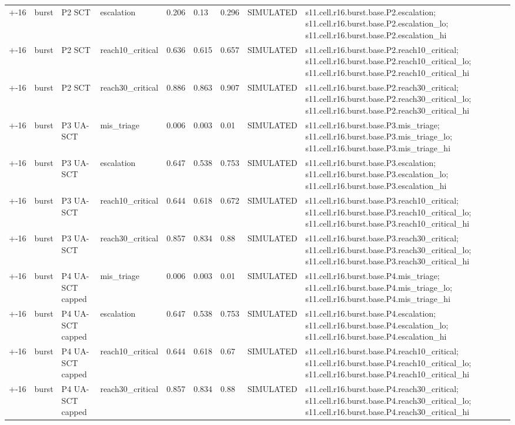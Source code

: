 \begin{table}[t]
\begin{tabular}{lllllllll}
+-16 & burst & P2 SCT & escalation & 0.206 & 0.13 & 0.296 & SIMULATED & s11.cell.r16.burst.base.P2.escalation; s11.cell.r16.burst.base.P2.escalation\_lo; s11.cell.r16.burst.base.P2.escalation\_hi \\
+-16 & burst & P2 SCT & reach10\_critical & 0.636 & 0.615 & 0.657 & SIMULATED & s11.cell.r16.burst.base.P2.reach10\_critical; s11.cell.r16.burst.base.P2.reach10\_critical\_lo; s11.cell.r16.burst.base.P2.reach10\_critical\_hi \\
+-16 & burst & P2 SCT & reach30\_critical & 0.886 & 0.863 & 0.907 & SIMULATED & s11.cell.r16.burst.base.P2.reach30\_critical; s11.cell.r16.burst.base.P2.reach30\_critical\_lo; s11.cell.r16.burst.base.P2.reach30\_critical\_hi \\
+-16 & burst & P3 UA-SCT & mis\_triage & 0.006 & 0.003 & 0.01 & SIMULATED & s11.cell.r16.burst.base.P3.mis\_triage; s11.cell.r16.burst.base.P3.mis\_triage\_lo; s11.cell.r16.burst.base.P3.mis\_triage\_hi \\
+-16 & burst & P3 UA-SCT & escalation & 0.647 & 0.538 & 0.753 & SIMULATED & s11.cell.r16.burst.base.P3.escalation; s11.cell.r16.burst.base.P3.escalation\_lo; s11.cell.r16.burst.base.P3.escalation\_hi \\
+-16 & burst & P3 UA-SCT & reach10\_critical & 0.644 & 0.618 & 0.672 & SIMULATED & s11.cell.r16.burst.base.P3.reach10\_critical; s11.cell.r16.burst.base.P3.reach10\_critical\_lo; s11.cell.r16.burst.base.P3.reach10\_critical\_hi \\
+-16 & burst & P3 UA-SCT & reach30\_critical & 0.857 & 0.834 & 0.88 & SIMULATED & s11.cell.r16.burst.base.P3.reach30\_critical; s11.cell.r16.burst.base.P3.reach30\_critical\_lo; s11.cell.r16.burst.base.P3.reach30\_critical\_hi \\
+-16 & burst & P4 UA-SCT capped & mis\_triage & 0.006 & 0.003 & 0.01 & SIMULATED & s11.cell.r16.burst.base.P4.mis\_triage; s11.cell.r16.burst.base.P4.mis\_triage\_lo; s11.cell.r16.burst.base.P4.mis\_triage\_hi \\
+-16 & burst & P4 UA-SCT capped & escalation & 0.647 & 0.538 & 0.753 & SIMULATED & s11.cell.r16.burst.base.P4.escalation; s11.cell.r16.burst.base.P4.escalation\_lo; s11.cell.r16.burst.base.P4.escalation\_hi \\
+-16 & burst & P4 UA-SCT capped & reach10\_critical & 0.644 & 0.618 & 0.67 & SIMULATED & s11.cell.r16.burst.base.P4.reach10\_critical; s11.cell.r16.burst.base.P4.reach10\_critical\_lo; s11.cell.r16.burst.base.P4.reach10\_critical\_hi \\
+-16 & burst & P4 UA-SCT capped & reach30\_critical & 0.857 & 0.834 & 0.88 & SIMULATED & s11.cell.r16.burst.base.P4.reach30\_critical; s11.cell.r16.burst.base.P4.reach30\_critical\_lo; s11.cell.r16.burst.base.P4.reach30\_critical\_hi \\

\end{tabular}
\end{table}
